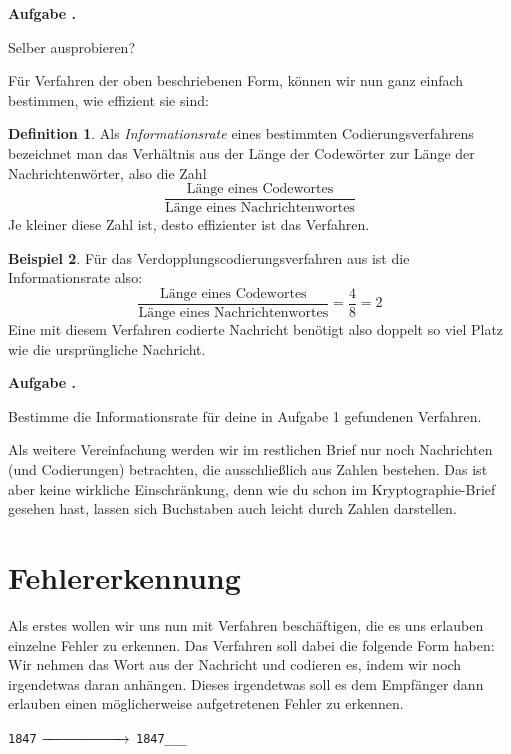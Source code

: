 \documentclass[a4paper,ngerman,12pt]{scrartcl}
\theoremstyle{definition}
\newtheorem{defn}{Definition}[]
\newtheorem{bsp}[defn]{Beispiel}
\theoremstyle{plain}
\theoremstyle{remark}
\newlength{\aufgabenskip}
\newcounter{aufgabennummer}
\newenvironment{aufgabe}[1]{
	\addtocounter{aufgabennummer}{1}
	\textbf{Aufgabe \theaufgabennummer.} \emph{#1} \par
}{\vspace{\aufgabenskip}}
\begin{document}
\begin{aufgabe}{}
	Selber ausprobieren?
\end{aufgabe}

Für Verfahren der oben beschriebenen Form, können wir nun ganz einfach bestimmen, wie effizient sie sind:

\begin{defn}
	Als \emph{Informationsrate} eines bestimmten Codierungsverfahrens bezeichnet man das Verhältnis aus der Länge der Codewörter zur Länge der Nachrichtenwörter, also die Zahl
		\[\frac{\text{Länge eines Codewortes}}{\text{Länge eines Nachrichtenwortes}}\]
	Je kleiner diese Zahl ist, desto effizienter ist das Verfahren.
\end{defn}

\begin{bsp}
	Für das Verdopplungscodierungsverfahren aus  ist die Informationsrate also:
		\[\frac{\text{Länge eines Codewortes}}{\text{Länge eines Nachrichtenwortes}} = \frac{4}{8} = 2\]
	Eine mit diesem Verfahren codierte Nachricht benötigt also doppelt so viel Platz wie die ursprüngliche Nachricht.
\end{bsp}

\begin{aufgabe}{}\label{aufgabe:verdreifachungsCodierungIR}
	Bestimme die Informationsrate für deine in Aufgabe 1 gefundenen Verfahren.
\end{aufgabe}

Als weitere Vereinfachung werden wir im restlichen Brief nur noch Nachrichten (und Codierungen) betrachten, die ausschließlich aus Zahlen bestehen. Das ist aber keine wirkliche Einschränkung, denn wie du schon im Kryptographie-Brief gesehen hast, lassen sich Buchstaben auch leicht durch Zahlen darstellen.


\section{Fehlererkennung}

Als erstes wollen wir uns nun mit Verfahren beschäftigen, die es uns erlauben einzelne Fehler zu erkennen. Das Verfahren soll dabei die folgende Form haben: Wir nehmen das Wort aus der Nachricht und codieren es, indem wir noch \glqq irgendetwas\grqq{} daran anhängen. Dieses \glqq irgendetwas\grqq{} soll es dem Empfänger dann erlauben einen möglicherweise aufgetretenen Fehler zu erkennen.
	\begin{center}
		\texttt{1847} $\xrightarrow{\hspace*{2cm}}$ \texttt{1847\_\_\_}
	\end{center}
\end{document}
